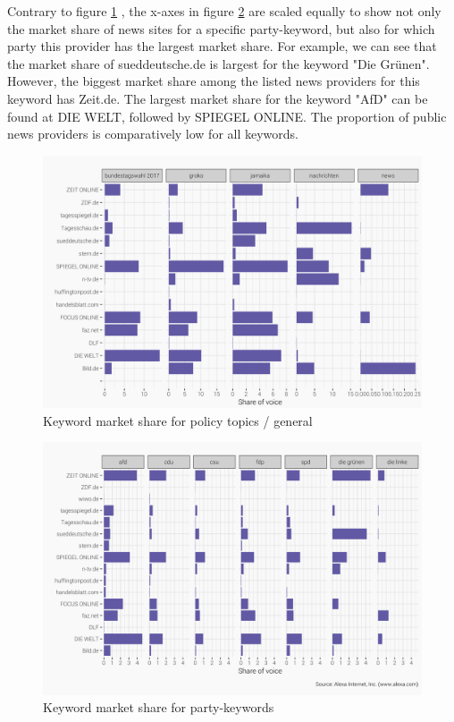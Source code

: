 \documentclass[12pt,a4paper,notitlepage]{article}
\begin{document}
Contrary to figure \ref{fig_keywords1} , the x-axes in figure \ref{fig_keywords2} are scaled equally to show not only the market share of news sites for a specific party-keyword, but also for which party this provider has the largest market share. For example, we can see that the market share of sueddeutsche.de is largest for the keyword "Die Grünen". However, the biggest market share among the listed news providers for this keyword has Zeit.de. The largest market share for the keyword "AfD" can be found at DIE WELT, followed by SPIEGEL ONLINE. The proportion of public news providers is comparatively low for all keywords. 

\begin{figure}[H]
	\begin{center}
			\includegraphics[width=.8\textwidth]{../figs/keywords1.png}
			\caption{Keyword market share for policy topics / general}
			\label{fig_keywords1}
	\end{center}
\end{figure}

\begin{figure}[H]
	\begin{center}
			\includegraphics[width=.8\textwidth]{../figs/keywords2.png}
			\caption{Keyword market share for party-keywords}
			\label{fig_keywords2}
	\end{center}
\end{figure}
\end{document}
